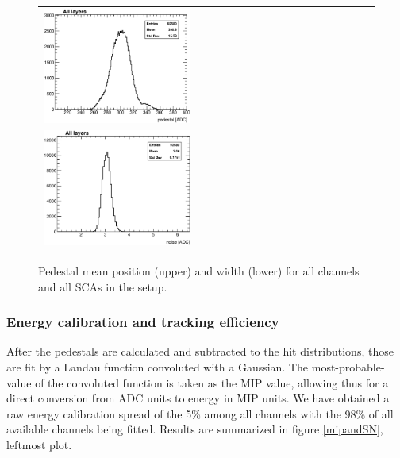 \documentclass[final,3p,times,twocolumn]{elsarticle}
\begin{document}
\begin{figure}[!t]
  \centering
  \begin{tabular}{l}
    \includegraphics[width=0.45\textwidth]{../figs/pedestal/h_ped_mean.eps} \\
    \includegraphics[width=0.45\textwidth]{../figs/pedestal/h_ped_width.eps}
  \end{tabular}
  \caption{Pedestal mean position (upper) and width (lower) for all channels and all SCAs in the setup.}
\label{pedestal_all}
\end{figure}

\subsubsection{Energy calibration and tracking efficiency}
\label{sec:mip}

After the pedestals are calculated and subtracted to the hit distributions, those are fit by
a Landau function convoluted with a Gaussian.
The most-probable-value of the convoluted function is taken as the MIP value, allowing thus for a direct
conversion from ADC units to energy in MIP units.
We have obtained a raw energy calibration spread of the 5\% among all channels with the 98\% of all 
available channels being fitted. Results are summarized in figure \ref{mipandSN}, leftmost plot.
\end{document}

